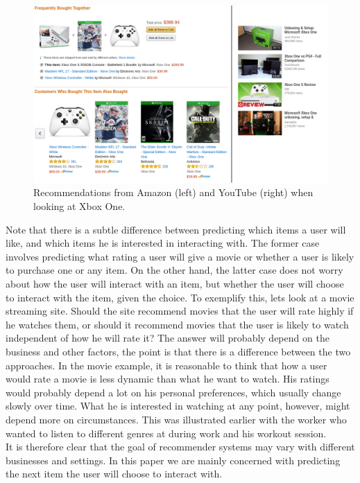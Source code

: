 \begin{figure}[htp]
	\centering
	\includegraphics[width=1.1\textwidth]{fig/recsys_example_xbox.png}
	\caption{Recommendations from Amazon (left) and YouTube (right) when looking at Xbox One.}
	\label{fig:recsys-example-xbox}
\end{figure}

Note that there is a subtle difference between predicting which items a user will like, and which items he is interested in interacting with. The former case involves predicting what rating a user will give a movie or whether a user is likely to purchase one or any item. On the other hand, the latter case does not worry about how the user will interact with an item, but whether the user will choose to interact with the item, given the choice. To exemplify this, lets look at a movie streaming site. Should the site recommend movies that the user will rate highly if he watches them, or should it recommend movies that the user is likely to watch independent of how he will rate it? The answer will probably depend on the business and other factors, the point is that there is a difference between the two approaches. In the movie example, it is reasonable to think that how a user would rate a movie is less dynamic than what he want to watch. His ratings would probably depend a lot on his personal preferences, which usually change slowly over time. What he is interested in watching at any point, however, might depend more on circumstances. This was illustrated earlier with the worker who wanted to listen to different genres at during work and his workout session.\\

It is therefore clear that the goal of recommender systems may vary with different businesses and settings. In this paper we are mainly concerned with predicting the next item the user will choose to interact with.\\

